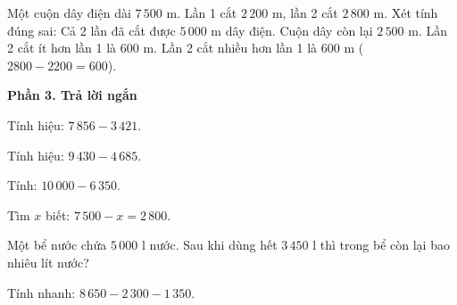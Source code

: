 \begin{ex} %
Một cuộn dây điện dài $7\,500\text{ m}$. Lần 1 cắt $2\,200\text{ m}$, lần 2 cắt $2\,800\text{ m}$. Xét tính đúng sai:
\choiceTF
{\True Cả 2 lần đã cắt được $5\,000\text{ m}$ dây điện.}
{\True Cuộn dây còn lại $2\,500\text{ m}$.}
{Lần 2 cắt ít hơn lần 1 là $600\text{ m}$.}
{\True Lần 2 cắt nhiều hơn lần 1 là $600\text{ m}$ ($2800 - 2200 = 600$).}
\end{ex}

\textbf{Phần 3. Trả lời ngắn}

\begin{ex} %
Tính hiệu: $7\,856 - 3\,421$.
\end{ex}

\begin{ex} %
Tính hiệu: $9\,430 - 4\,685$.
\end{ex}

\begin{ex} %
Tính: $10\,000 - 6\,350$.
\end{ex}

\begin{ex} %
Tìm $x$ biết: $7\,500 - x = 2\,800$.
\end{ex}

\begin{ex} %
Một bể nước chứa $5\,000\text{ l}$ nước. Sau khi dùng hết $3\,450\text{ l}$ thì trong bể còn lại bao nhiêu lít nước?
\end{ex}

\begin{ex} %
Tính nhanh: $8\,650 - 2\,300 - 1\,350$.
\end{ex}
